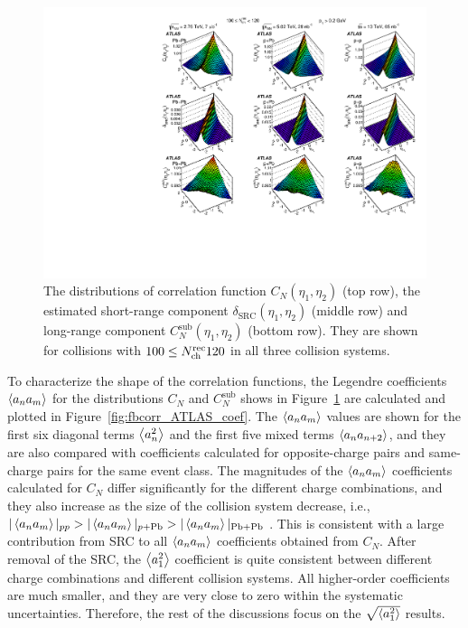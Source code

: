 \begin{figure}[H]
\centering
\includegraphics[width=.95\linewidth]{figs/chapter_fbcorr/ATLAS_corr_2D.pdf}
\caption{The distributions of correlation function $C_N(\eta_1, \eta_2)$ (top row), the estimated short-range component $\delta_\text{SRC}(\eta_1, \eta_2)$ (middle row) and long-range component $C_N^\text{sub}(\eta_1, \eta_2)$ (bottom row). They are shown for collisions with $100 \le N_\text{ch}^\text{rec} 120$ in all three collision systems.}
\label{fig:fbcorr_ATLAS_corr_2D}
\end{figure}

To characterize the shape of the correlation functions, the Legendre coefficients $\left\langle a_n a_m\right\rangle$ for the distributions $C_N$ and $C_N^\text{sub}$ shows in Figure~\ref{fig:fbcorr_ATLAS_corr_2D} are calculated and plotted in Figure~\ref{fig:fbcorr_ATLAS_coef}. The $\left\langle a_n a_m\right\rangle$ values are shown for the first six diagonal terms $\left\langle a_n^2\right\rangle$ and the first five mixed terms $\left\langle a_n a_{n+2}\right\rangle$, and they are also compared with coefficients calculated for opposite-charge pairs and same-charge pairs for the same event class. The magnitudes of the $\left\langle a_n a_m\right\rangle$ coefficients calculated for $C_N$ differ significantly for the different charge combinations, and they also increase as the size of the collision system decrease, i.e., $|\left\langle a_n a_m\right\rangle|_{pp} > |\left\langle a_n a_m\right\rangle|_{p\text{+Pb}} > |\left\langle a_n a_m\right\rangle|_\text{Pb+Pb}$ . This is consistent with a large contribution from SRC to all $\left\langle a_n a_m\right\rangle$ coefficients obtained from $C_N$. After removal of the SRC, the $\left\langle a_1^2\right\rangle$ coefficient is quite consistent between different charge combinations and different collision systems. All higher-order coefficients are much smaller, and they are very close to zero within the systematic uncertainties. Therefore, the rest of the discussions focus on the $\sqrt{\left\langle a_1^2\right\rangle}$ results.

